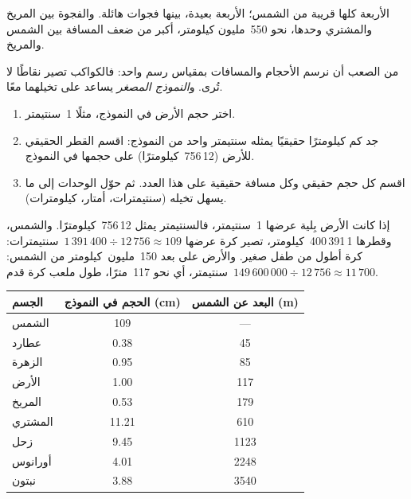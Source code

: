  الأربعة كلها قريبة من الشمس؛  الأربعة
بعيدة، بينها فجوات هائلة. والفجوة بين المريخ والمشتري وحدها، نحو 550~مليون كيلومتر، أكبر من ضعف المسافة بين الشمس والمريخ.

من الصعب أن نرسم الأحجام والمسافات بمقياس رسم واحد: فالكواكب
تصير نقاطًا لا تُرى. و\emph{النموذج المصغر} يساعد على تخيلهما معًا.

\begin{method}\label{met:g6:earth-a-planet:scale-model}
\begin{enumerate}
  \item اختر حجم الأرض في النموذج، مثلًا 1~سنتيمتر.
  \item جد كم كيلومترًا حقيقيًا يمثله سنتيمتر واحد من النموذج: اقسم
        القطر الحقيقي للأرض (12\,756~كيلومترًا) على حجمها في النموذج.
  \item اقسم كل حجم حقيقي وكل مسافة حقيقية على هذا العدد.
        ثم حوّل الوحدات إلى ما يسهل تخيله (سنتيمترات،
        أمتار، كيلومترات).
\end{enumerate}
\end{method}

\begin{example}\label{ex:g6:earth-a-planet:marble}
إذا كانت الأرض بِلية عرضها 1~سنتيمتر، فالسنتيمتر يمثل 12\,756~كيلومترًا. والشمس،
وقطرها 1\,391\,400~كيلومتر، تصير كرة عرضها $1\,391\,400 \div 12\,756 \approx
109$~سنتيمترات: كرة أطول من طفل صغير. والأرض على بعد
150~مليون~كيلومتر من الشمس: $149\,600\,000 \div 12\,756 \approx 11\,700$~سنتيمتر،
أي نحو 117~مترًا، طول ملعب كرة قدم.
\end{example}

\begin{center}\small
\begin{tabular}{|l|c|c|}
\hline
\textbf{الجسم} & \textbf{الحجم في النموذج (cm)} & \textbf{البعد عن الشمس (m)} \\
\hline
الشمس & 109 & --- \\
عطارد & 0.38 & 45 \\
الزهرة & 0.95 & 85 \\
الأرض & 1.00 & 117 \\
المريخ & 0.53 & 179 \\
المشتري & 11.21 & 610 \\
زحل & 9.45 & 1123 \\
أورانوس & 4.01 & 2248 \\
نبتون & 3.88 & 3540 \\
\hline
\end{tabular}
\end{center}

